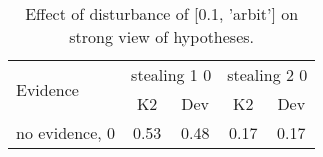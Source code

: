 \begin{table}\begin{tabular}{l|cc|cc}\toprule\multirow{2}{*}{Evidence} & \multicolumn{2}{c}{stealing 1 0}& \multicolumn{2}{c}{stealing 2 0}\\& {K2} & {Dev}& {K2} & {Dev}\\\midrule
no evidence, 0 & \cellcolor{Bittersweet}0.53&\cellcolor{Bittersweet}0.48&0.17&0.17\\\bottomrule\end{tabular}\caption{Effect of disturbance of [0.1, 'arbit'] on strong view of hypotheses.}\end{table}